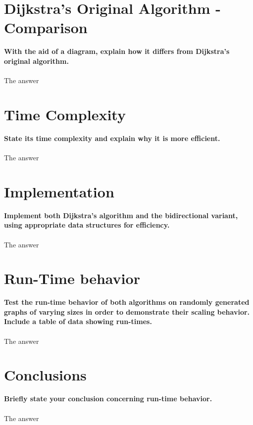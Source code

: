 \documentclass[paper=a4, fontsize=11pt]{scrartcl} %
\begin{document}
\section{Dijkstra's Original Algorithm - Comparison}
{\bf With the aid of a diagram, explain how it differs from Dijkstra's original algorithm.}\\\\
{The answer}


\section{Time Complexity}
{\bf State its time complexity and explain why it is more efficient.}\\\\
{The answer}

\section{Implementation}
{\bf Implement both Dijkstra's algorithm and the bidirectional variant, using appropriate data structures for efficiency.}\\\\
{The answer}

\section{Run-Time behavior}
{\bf Test the run-time behavior of both algorithms on randomly generated graphs of varying
sizes in order to demonstrate their scaling behavior. Include a table of data showing run-times.}\\\\
{The answer}

\section{Conclusions}
{\bf Briefly state your conclusion concerning run-time behavior.}\\\\
{The answer}

\clearpage
\begin{thebibliography}{9}
\end{thebibliography}
\end{document}
